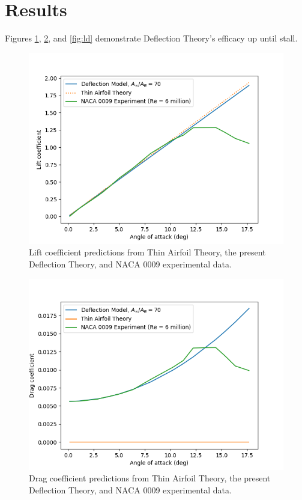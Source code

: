 \section{Results}

Figures \ref{fig:cl}, \ref{fig:cd}, and \ref{fig:ld} demonstrate Deflection Theory's efficacy up until stall.

\graphicspath{{./}}

\begin{figure}[htb]
\includegraphics[totalheight=4.5cm]{cl}
\caption{Lift coefficient predictions from Thin Airfoil Theory, the present Deflection Theory, and NACA 0009 experimental data.}
\label{fig:cl}
\end{figure}

\begin{figure}[htb]
\includegraphics[totalheight=4.5cm]{cd}
\caption{Drag coefficient predictions from Thin Airfoil Theory, the present Deflection Theory, and NACA 0009 experimental data.}
\label{fig:cd}
\end{figure}

